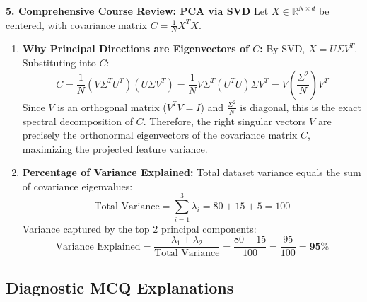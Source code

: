 \textbf{5. Comprehensive Course Review: PCA via SVD}
Let $X \in \mathbb{R}^{N \times d}$ be centered, with covariance matrix $C = \frac{1}{N} X^T X$.
\begin{enumerate}
    \item \textbf{Why Principal Directions are Eigenvectors of $C$:}
    By SVD, $X = U \Sigma V^T$. Substituting into $C$:
    \begin{equation*}
    C = \frac{1}{N} (V \Sigma^T U^T)(U \Sigma V^T) = \frac{1}{N} V \Sigma^T (U^T U) \Sigma V^T = V \left(\frac{\Sigma^2}{N}\right) V^T
    \end{equation*}
    Since $V$ is an orthogonal matrix ($V^T V = I$) and $\frac{\Sigma^2}{N}$ is diagonal, this is the exact spectral decomposition of $C$. Therefore, the right singular vectors $V$ are precisely the orthonormal eigenvectors of the covariance matrix $C$, maximizing the projected feature variance.
    \item \textbf{Percentage of Variance Explained:}
    Total dataset variance equals the sum of covariance eigenvalues:
    \begin{equation*}
    \text{Total Variance} = \sum_{i=1}^3 \lambda_i = 80 + 15 + 5 = 100
    \end{equation*}
    Variance captured by the top 2 principal components:
    \begin{equation*}
    \text{Variance Explained} = \frac{\lambda_1 + \lambda_2}{\text{Total Variance}} = \frac{80 + 15}{100} = \frac{95}{100} = \mathbf{95\%}
    \end{equation*}
\end{enumerate}

\subsection*{Diagnostic MCQ Explanations}

